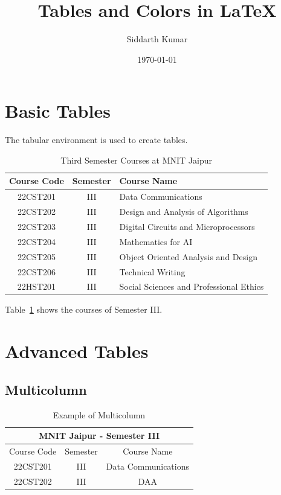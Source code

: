 \documentclass{article}
\title{Tables and Colors in LaTeX}
\author{Siddarth Kumar}
\date{\today}
\begin{document}
\maketitle

\section{Basic Tables}

The tabular environment is used to create tables.

\begin{table}[h!]
    \centering
    \begin{tabular}{|c|c|l|}
        \hline
        \textbf{Course Code} & \textbf{Semester} & \textbf{Course Name} \\
        \hline
        22CST201 & III & Data Communications \\
        22CST202 & III & Design and Analysis of Algorithms \\
        22CST203 & III & Digital Circuits and Microprocessors \\
        22CST204 & III & Mathematics for AI \\
        22CST205 & III & Object Oriented Analysis and Design \\
        22CST206 & III & Technical Writing \\
        22HST201 & III & Social Sciences and Professional Ethics \\
        \hline
    \end{tabular}
    \caption{Third Semester Courses at MNIT Jaipur}
    \label{tab:courses}
\end{table}

Table~\ref{tab:courses} shows the courses of Semester III.

\section{Advanced Tables}

\subsection{Multicolumn}

\begin{table}[h!]
    \centering
    \begin{tabular}{|c|c|c|}
        \hline
        \multicolumn{3}{|c|}{\textbf{MNIT Jaipur - Semester III}} \\
        \hline
        Course Code & Semester & Course Name \\
        \hline
        22CST201 & III & Data Communications \\
        22CST202 & III & DAA \\
        \hline
    \end{tabular}
    \caption{Example of Multicolumn}
\end{table}
\end{document}
